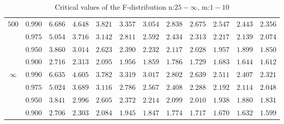 \documentclass[11pt]{article}
\theoremstyle{definition}
\begin{document}
\begin{table}[H]
\begin{tabularx}{\linewidth}{c | c | c c c c c c c c c c}
		$500$ & $0.990$ & $6.686$ & $4.648$ & $3.821$ & $3.357$ & $3.054$ & $2.838$ & $2.675$ & $2.547$ & $2.443$ & $2.356$ \\
		& $0.975$ & $5.054$ & $3.716$ & $3.142$ & $2.811$ & $2.592$ & $2.434$ & $2.313$ & $2.217$ & $2.139$ & $2.074$ \\
		& $0.950$ & $3.860$ & $3.014$ & $2.623$ & $2.390$ & $2.232$ & $2.117$ & $2.028$ & $1.957$ & $1.899$ & $1.850$ \\
		& $0.900$ & $2.716$ & $2.313$ & $2.095$ & $1.956$ & $1.859$ & $1.786$ & $1.729$ & $1.683$ & $1.644$ & $1.612$ \\
		$\infty$ & $0.990$ & $6.635$ & $4.605$ & $3.782$ & $3.319$ & $3.017$ & $2.802$ & $2.639$ & $2.511$ & $2.407$ & $2.321$ \\
		& $0.975$ & $5.024$ & $3.689$ & $3.116$ & $2.786$ & $2.567$ & $2.408$ & $2.288$ & $2.192$ & $2.114$ & $2.048$ \\
		& $0.950$ & $3.841$ & $2.996$ & $2.605$ & $2.372$ & $2.214$ & $2.099$ & $2.010$ & $1.938$ & $1.880$ & $1.831$ \\
		& $0.900$ & $2.706$ & $2.303$ & $2.084$ & $1.945$ & $1.847$ & $1.774$ & $1.717$ & $1.670$ & $1.632$ & $1.599$
	\end{tabularx}
	\caption{Critical values of the F-distribution n:$25-\infty$, m:$1-10$}
\end{table}
\end{document}
